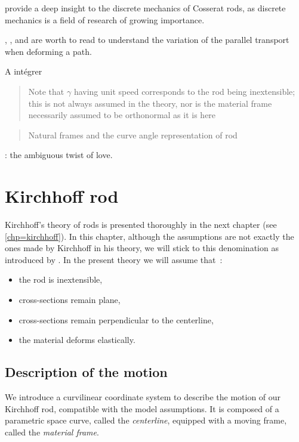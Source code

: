  provide a deep insight to the discrete mechanics of Cosserat rods, as discrete mechanics is a field of research of growing importance.

, ,  and  are worth to read to understand the variation of the parallel transport when deforming a path.

A intégrer

\blockcquote[p.~607]{Langer1996}{Note that $\gamma$ having unit speed corresponds to the rod being inextensible; this is not always assumed in the theory, nor is the material frame necessarily assumed to be orthonormal as it is here}
\blockcquote[p.~607]{Langer1996}{Natural frames and the curve angle representation of rod}

 : the ambiguous twist of love.



\section{Kirchhoff rod}\label{sec=kirchhoff_rod}
Kirchhoff's theory of rods is presented thoroughly in the next chapter (see \cref{chp=kirchhoff}). In this chapter, although the assumptions are not exactly the ones made by  Kirchhoff in his theory, we will stick to this denomination as introduced by \cite{Bergou2008}. In the present theory we will assume that~:
\begin{itemize}
\item the rod is inextensible,
\item cross-sections remain plane,
\item cross-sections remain perpendicular to the centerline,
\item the material deforms elastically.
\end{itemize}

\subsection{Description of the motion}\label{sec=description_motion}
We introduce a curvilinear coordinate system to describe the motion of our Kirchhoff rod, compatible with the model assumptions. It is composed of a parametric space curve, called the \emph{centerline}, equipped with a moving frame, called the \emph{material frame}.

